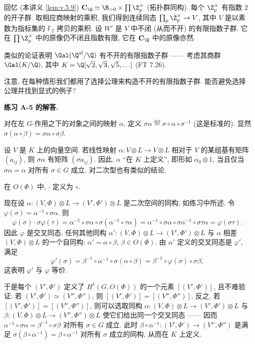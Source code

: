 回忆 (本讲义 \ref{lem:v.5.9}) $\mathbf{C}_{\Q}\simeq\R_{>0}\times\prod\Z_p^{\times}$ (拓扑群同构). 每个 $\Z_p^{\times}$ 有指数 $2$ 的开子群. 取相应商映射的乘积, 我们得到连续同态 $\prod_p\Z_p^{\times}\to V$, 其中 $V$ 是以素数为指标集的 $\mathbb{F}_2$ 拷贝的乘积. 设 $W'$ 是 $V$ 中不闭 (从而不开) 的有限指数子群. 它在 $\prod\Z_p^{\times}$ 中的原像仍不闭且指数有限, 它在 $\mathbf{C}_{\Q}$ 中的原像亦然.

类似的论证表明 $\Gal(\Q^{\mathrm{al}}/\Q)$ 有不开的有限指数子群 —— 考虑其商群 $\Gal(K/\Q)$, 其中 $K=\Q[\sqrt{2},\sqrt{3},\sqrt{5},\ldots]$ (FT 7.26).

注意, 在每种情形我们都用了选择公理来构造不开的有限指数子群. 能否避免选择公理并找到显式的例子?

\noindent\textbf{练习 A-5 的解答.}

对在左 $G$-作用之下的对象之间的映射 $\alpha$, 定义 $\sigma\alpha\overset{\mathrm{def}}{=}\sigma\circ\alpha\circ\sigma^{-1}$ (这是标准的). 显然 $\sigma(\alpha\circ\beta)=\sigma\alpha\circ\sigma\beta$.

设 $V$ 是 $K$ 上的向量空间. 若线性映射 $\alpha\colon V\otimes L\to V\otimes L$ 相对于 $V$ 的某组基有矩阵 $(a_{ij})$, 则 $\sigma\alpha$ 有矩阵 $(\sigma a_{ij})$. 因此, $\alpha$ ``在 $K$ 上定义'', 即形如 $\alpha_0\otimes1$, 当且仅当 $\sigma\alpha=\alpha$ 对所有 $\sigma\in G$ 成立. 对二次型也有类似的结论.

在 $O(\Phi)$ 中, $\cdot$ 定义为 $\circ$.

现在设 $\alpha\colon(V,\Phi)\otimes L\to(V',\Phi')\otimes L$ 是二次空间的同构, 如练习中所述. 令 $\varphi(\sigma)=\alpha^{-1}\circ\sigma\alpha$. 则
\[
\varphi(\sigma)\cdot\sigma\varphi(\tau)=\alpha^{-1}\circ\sigma\alpha\circ\sigma(\alpha^{-1}\circ\tau\alpha)=\alpha^{-1}\circ\sigma\alpha\circ\sigma\alpha^{-1}\circ\sigma\tau\alpha=\varphi(\sigma\tau).
\]
因此 $\varphi$ 是交叉同态. 任何其他同构 $\alpha'\colon(V,\Phi)\otimes L\to(V',\Phi')\otimes L$ 与 $\alpha$ 相差 $(V,\Phi)\otimes L$ 的一个自同构: $\alpha'=\alpha\circ\beta$, $\beta\in O(\Phi)$. 由 $\alpha'$ 定义的交叉同态是 $\varphi'$, 满足
\[
\varphi'(\sigma)=\beta^{-1}\circ\alpha^{-1}\circ\sigma(\alpha\circ\beta)=\beta^{-1}\circ\varphi(\sigma)\circ\sigma\beta,
\]
这表明 $\varphi'$ 与 $\varphi$ 等价.

于是每个 $(V',\Phi')$ 定义了 $H^{1}(G,O(\Phi))$ 的一个元素 $[(V',\Phi')]$, 且不难验证: 若 $(V',\Phi')\simeq(V'',\Phi'')$, 则 $[(V',\Phi')]=[(V'',\Phi'')]$. 反之, 若 $[(V',\Phi')]=[(V'',\Phi'')]$, 则可以选取同构 $\alpha\colon(V,\Phi)\otimes L\to(V',\Phi')\otimes L$ 与 $\beta\colon(V,\Phi)\otimes L\to(V'',\Phi'')\otimes L$ 使它们给出同一个交叉同态 —— 因而 $\alpha^{-1}\circ\sigma\alpha=\beta^{-1}\circ\sigma\beta$ 对所有 $\sigma\in G$ 成立. 此时 $\beta\circ\alpha^{-1}\colon(V',\Phi')\to(V'',\Phi'')$ 是满足 $\sigma(\beta\circ\alpha^{-1})=\beta\circ\alpha^{-1}$ 对所有 $\sigma$ 成立的同构, 从而在 $K$ 上定义.

